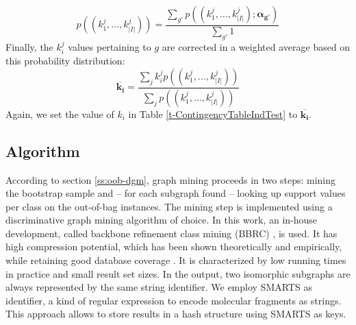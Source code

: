 \documentclass{article}
\begin{document}
\begin{equation}
  p((k_1^j,\ldots,k_{\vert I\vert}^j))=\frac{\sum_{g'} p((k_1^j,\ldots,k_{\vert I\vert}^j); \mathbf{\alpha_{g'}})}{\sum_{g'}1}
  \label{eqn:avgpr}
\end{equation}
Finally, the $k_i^j$ values pertaining to $g$ are corrected in a weighted average
based on this probability distribution:
\begin{equation}
  \overline{\mathbf{k_i}}=\frac{\sum_j k_i^j p((k_1^j,\ldots,k_{\vert I\vert}^j))}{\sum_j p((k_1^j,\ldots,k_{\vert I\vert}^j))}
  \label{eqn:avgki}
\end{equation}
Again, we set the value of $k_i$ in Table \ref{t-ContingencyTableIndTest} to $\overline{\mathbf{k_i}}$.

\subsection{Algorithm}
\label{s:Algorithm}
According to section \ref{ss:oob-dgm}, graph mining proceeds in two steps:
mining the bootstrap sample and -- for each subgraph found -- looking up
support values per class on the out-of-bag instances.  The mining step is
implemented using a discriminative graph mining algorithm of choice. In this
work, an in-house development, called backbone refinement class mining (BBRC)
\cite{maunz09largescale}, is used.  It has high compression potential, which
has been shown theoretically and empirically, while retaining good database
coverage \cite{maunz11efficient}.  It is characterized by low running times in
practice and small result set sizes. In the output, two isomorphic subgraphs
are always represented by the same string identifier.  We employ SMARTS as
identifier, a kind of regular expression to encode molecular fragments as
strings.  This approach allows to store results in a hash structure using SMARTS as
keys.
\end{document}
